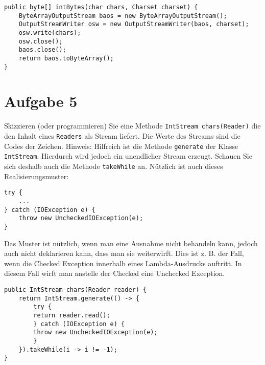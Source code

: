 \begin{lstlisting}
public byte[] intBytes(char chars, Charset charset) {
    ByteArrayOutputStream baos = new ByteArrayOutputStream();
    OutputStreamWriter osw = new OutputStreamWriter(baos, charset);
    osw.write(chars);
    osw.close();
    baos.close();
    return baos.toByteArray();
}
\end{lstlisting}

\section{Aufgabe 5}
Skizzieren (oder programmieren) Sie eine Methode 
\lstinline{IntStream chars(Reader)} die den Inhalt eines \lstinline{Readers} als Stream liefert. Die
Werte des Streams sind die Codes der Zeichen. Hinweis: Hilfreich ist die
Methode \lstinline{generate} der Klasse \lstinline{IntStream}. Hierdurch wird
jedoch ein unendlicher Stream erzeugt. Schauen Sie sich deshalb auch die
Methode \lstinline{takeWhile} an. Nützlich ist auch dieses Realisierungsmuster:
\begin{lstlisting}
try {
    ...
} catch (IOException e) {
    throw new UncheckedIOException(e);
}
\end{lstlisting}
Das Muster ist nützlich, wenn man eine Ausnahme nicht behandeln kann, jedoch
auch nicht deklarieren kann, dass man sie weiterwirft. Dies ist z. B. der Fall,
wenn die Checked Exception innerhalb eines Lambda-Ausdrucks auftritt. In diesem
Fall wirft man anstelle der Checked eine Unchecked Exception.

\begin{lstlisting}
public IntStream chars(Reader reader) {
    return IntStream.generate(() -> {
        try {
        return reader.read();
        } catch (IOException e) {
        throw new UncheckedIOException(e);
        }
    }).takeWhile(i -> i != -1);
}
\end{lstlisting}
